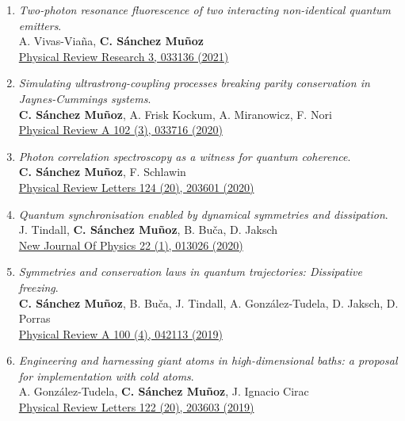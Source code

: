 \begin{enumerate}
 \item \emph{Two-photon resonance fluorescence of two interacting non-identical quantum emitters}.\\ 
{A. Vivas-Viaña, \textbf{C. Sánchez Muñoz}}\\ 
  \href{https://journals.aps.org/prresearch/abstract/10.1103/PhysRevResearch.3.033136}{{Physical Review Research 3, 033136 (2021)}}

 \item \emph{Simulating ultrastrong-coupling processes breaking parity conservation in Jaynes-Cummings systems}.\\ 
{\textbf{C. Sánchez Muñoz}, A. Frisk Kockum, A. Miranowicz, F. Nori}\\ 
  \href{https://journals.aps.org/pra/abstract/10.1103/PhysRevA.102.033716}{{Physical Review A 102 (3), 033716 (2020)}}

 \item \emph{Photon correlation spectroscopy as a witness for quantum coherence}.\\ 
{\textbf{C. Sánchez Muñoz}, F. Schlawin}\\ 
  \href{https://journals.aps.org/prl/abstract/10.1103/PhysRevLett.124.203601}{{Physical Review Letters 124 (20), 203601 (2020)}}

 \item \emph{Quantum synchronisation enabled by dynamical symmetries and dissipation}.\\ 
{J. Tindall, \textbf{C. Sánchez Muñoz}, B. Buča, D. Jaksch}\\ 
  \href{https://iopscience.iop.org/article/10.1088/1367-2630/ab60f5/meta}{{New Journal Of Physics 22 (1), 013026 (2020)}}

 \item \emph{Symmetries and conservation laws in quantum trajectories: Dissipative freezing}.\\ 
{\textbf{C. Sánchez Muñoz}, B. Buča, J. Tindall, A. González-Tudela, D. Jaksch, D. Porras}\\ 
  \href{https://journals.aps.org/pra/abstract/10.1103/PhysRevA.100.042113}{{Physical Review A 100 (4), 042113 (2019)}}

 \item \emph{Engineering and harnessing giant atoms in high-dimensional baths: a proposal for implementation with cold atoms}.\\ 
{A. González-Tudela, \textbf{C. Sánchez Muñoz}, J. Ignacio Cirac}\\ 
  \href{https://journals.aps.org/prl/abstract/10.1103/PhysRevLett.122.203603}{{Physical Review Letters 122 (20), 203603 (2019)}}


\end{enumerate}
